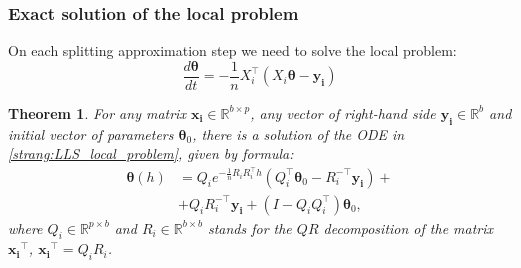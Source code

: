 \documentclass{article}
\newtheorem{theorem}{Theorem}
\newcommand{\vect}[1]{\boldsymbol{\mathbf{#1}}}
\begin{document}
\subsubsection{Exact solution of the local problem}
On each splitting approximation step we need to solve the local problem:
\begin{equation}\label{strang:LLS_local_problem}
\frac{d \vect{\theta}}{d t} = - \frac{1}{n}X_i^\top(X_i \vect{\theta} - \vect{y_i})
\end{equation}
\begin{theorem}\label{strang:LLS_local_solution} For any matrix $\vect{x_i} \in \mathbb{R}^{b \times p}$, any vector of right-hand side $\vect{y_i} \in \mathbb{R}^{b}$ and initial vector of parameters $\vect{\theta}_0$, there is a solution of the ODE in \eqref{strang:LLS_local_problem}, given by formula:
\begin{equation}\label{strang:LLS_local_solution_formula}
\begin{split}
\vect{\theta}(h) &= Q_i e^{-\frac{1}{n}R_iR_i^\top h} \left( Q_i^\top \vect{\theta}_0 - R_i^{-\top}\vect{y_i}\right) + \\ &+ Q_iR_i^{-\top}\vect{y_i} + (I - Q_iQ_i^\top)\vect{\theta}_0,
\end{split}
\end{equation}
where $Q_i \in \mathbb{R}^{p \times b}$ and $R_i \in \mathbb{R}^{b \times b}$ stands for the $QR$ decomposition of the matrix $\vect{x_i}^\top$, $\vect{x_i}^\top = Q_i R_i$.
\end{theorem}
\end{document}
